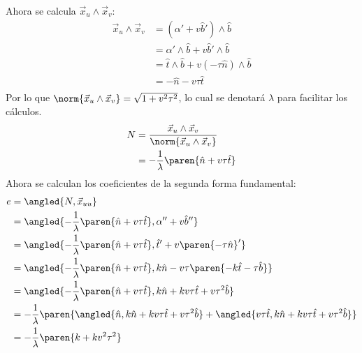\documentclass{homework}
\begin{document}
\begin{sol}
\begin{enumerate}
              Ahora se calcula \(\vec{x}_u\wedge\vec{x}_v\):
              \begin{align*}
                  \vec{x}_u\wedge\vec{x}_v & =(\alpha'+v\hat{b}')\wedge\hat{b}                  \\
                                           & =\alpha'\wedge\hat{b}+v\hat{b}'\wedge\hat{b}       \\
                                           & =\hat{t}\wedge\hat{b}+v(-\tau\hat{n})\wedge\hat{b} \\
                                           & =-\hat{n}-v\tau\hat{t}                             \\
              \end{align*}
              Por lo que \(\norm{\vec{x}_u\wedge\vec{x}_v}=\sqrt{1+v^2\tau^2}\), lo cual se denotará \(\lambda\) para facilitar los cálculos.
              \begin{align*}
                  N & =\frac{\vec{x}_u\wedge\vec{x}_v}{\norm{\vec{x}_u\wedge\vec{x}_v}} \\
                    & =-\frac1\lambda\paren{\hat{n}+v\tau\hat{t}}
              \end{align*}
              Ahora se calculan los coeficientes de la segunda forma fundamental:
              \begin{align*}
                  e & =\angled{N,\vec{x}_{uu}}                                                                                                                  \\
                    & =\angled{-\frac1\lambda\paren{\hat{n}+v\tau\hat{t}},\alpha''+v\hat{b}''}                                                                  \\
                    & =\angled{-\frac1\lambda\paren{\hat{n}+v\tau\hat{t}},\hat{t}'+v\paren{-\tau\hat{n}}'}                                                      \\
                    & =\angled{-\frac1\lambda\paren{\hat{n}+v\tau\hat{t}},k\hat{n}-v\tau\paren{-k\hat{t}-\tau\hat{b}}}                                          \\
                    & =\angled{-\frac1\lambda\paren{\hat{n}+v\tau\hat{t}},k\hat{n}+kv\tau\hat{t}+v\tau^2\hat{b}}                                                \\
                    & =-\frac1\lambda\paren{\angled{\hat{n},k\hat{n}+kv\tau\hat{t}+v\tau^2\hat{b}}+\angled{v\tau\hat{t},k\hat{n}+kv\tau\hat{t}+v\tau^2\hat{b}}} \\
                    & =-\frac1\lambda\paren{k+kv^2\tau^2}                                                                                                       \\

\end{align*}
\end{enumerate}
\end{sol}
\end{document}
